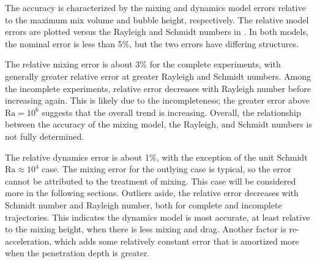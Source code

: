 The accuracy is characterized by the mixing and dynamics model errors relative to the maximum mix volume and bubble height, respectively.
The relative model errors are plotted versus the Rayleigh and Schmidt numbers in .
In both models, the nominal error is less than 5\%, but the two errors have differing structures.

The relative mixing error is about 3\% for the complete experiments, with generally greater relative error at greater Rayleigh and Schmidt numbers.
Among the incomplete experiments, relative error decreases with Rayleigh number before increasing again.
This is likely due to the incompleteness; the greater error above $\text{Ra} = 10^6$ suggests that the overall trend is increasing.
Overall, the relationship between the accuracy of the mixing model, the Rayleigh, and Schmidt numbers is not fully determined.

The relative dynamics error is about 1\%, with the exception of the unit Schmidt $\text{Ra} \approx 10^4$ case.
The mixing error for the outlying case is typical, so the error cannot be attributed to the treatment of mixing.
This case will be considered more in the following sections.
Outliers aside, the relative error decreases with Schmidt number and Rayleigh number, both for complete and incomplete trajectories.
This indicates the dynamics model is most accurate, at least relative to the mixing height, when there is less mixing and drag.
Another factor is re-acceleration, which adds some relatively constant error that is amortized more when the penetration depth is greater.

